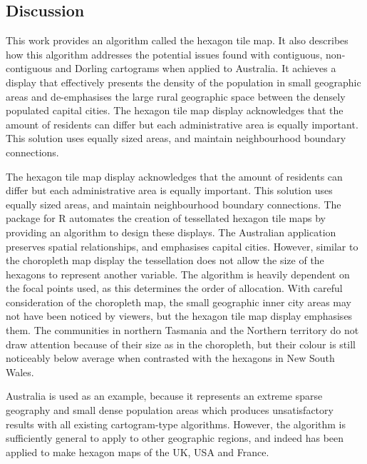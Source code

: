 \hypertarget{discussion}{%
\subsection{Discussion}\label{discussion}}

This work provides an algorithm called the hexagon tile map.
It also describes how this algorithm addresses the potential issues found with contiguous, non-contiguous and Dorling cartograms when applied to Australia. It achieves a display that effectively presents the density of the population in small geographic areas and de-emphasises the large rural geographic space between the densely populated capital cities. The hexagon tile map display acknowledges that the amount of residents can differ but each administrative area is equally important. This solution uses equally sized areas, and maintain neighbourhood boundary connections.

The hexagon tile map display acknowledges that the amount of residents can differ but each administrative area is equally important. This solution uses equally sized areas, and maintain neighbourhood boundary connections. The  package for R automates the creation of tessellated hexagon tile maps by providing an algorithm to design these displays. The Australian application preserves spatial relationships, and emphasises capital cities.
However, similar to the choropleth map display the tessellation does not allow the size of the hexagons to represent another variable. The algorithm is heavily dependent on the focal points used, as this determines the order of allocation. With careful consideration of the choropleth map, the small geographic inner city areas may not have been noticed by viewers, but the hexagon tile map display emphasises them. The communities in northern Tasmania and the Northern territory do not draw attention because of their size as in the choropleth, but their colour is still noticeably below average when contrasted with the hexagons in New South Wales.

Australia is used as an example, because it represents an extreme sparse geography and small dense population areas which produces unsatisfactory results with all existing cartogram-type algorithms. However, the algorithm is sufficiently general to apply to other geographic regions, and indeed has been applied to make hexagon maps of the UK, USA and France.

